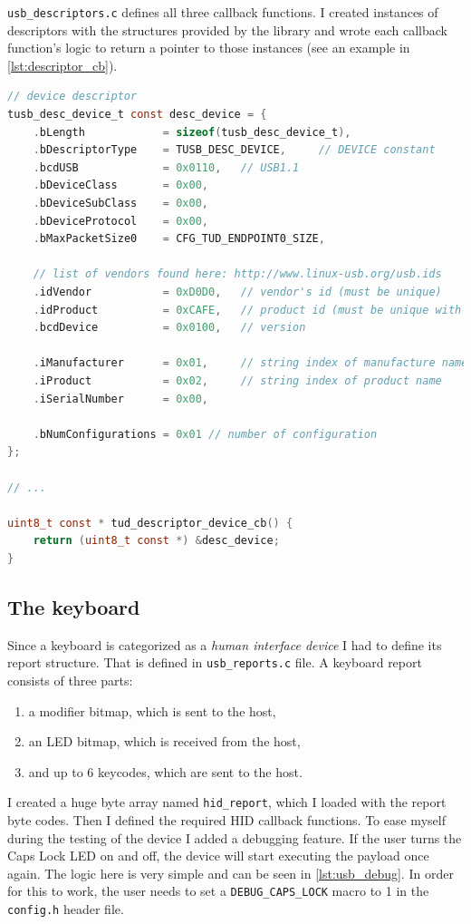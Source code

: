 \verb|usb_descriptors.c| defines all three callback functions. I created instances of descriptors with the structures provided by the library and wrote each callback function's logic to return a pointer to those instances (see an example in \autoref{lst:descriptor_cb}).

\begin{lstlisting}[caption={Definition of the \emph{device descriptor} and its callback function used in \texttt{usb\_descriptors.c}.},
                   label={lst:descriptor_cb},
                   language=c]
// device descriptor
tusb_desc_device_t const desc_device = {
    .bLength            = sizeof(tusb_desc_device_t),
    .bDescriptorType    = TUSB_DESC_DEVICE,     // DEVICE constant
    .bcdUSB             = 0x0110,   // USB1.1
    .bDeviceClass       = 0x00,
    .bDeviceSubClass    = 0x00,
    .bDeviceProtocol    = 0x00,
    .bMaxPacketSize0    = CFG_TUD_ENDPOINT0_SIZE,

    // list of vendors found here: http://www.linux-usb.org/usb.ids
    .idVendor           = 0xD0D0,   // vendor's id (must be unique)
    .idProduct          = 0xCAFE,   // product id (must be unique with vendor)
    .bcdDevice          = 0x0100,   // version

    .iManufacturer      = 0x01,     // string index of manufacture name
    .iProduct           = 0x02,     // string index of product name
    .iSerialNumber      = 0x00,

    .bNumConfigurations = 0x01 // number of configuration
};

// ...

uint8_t const * tud_descriptor_device_cb() {
    return (uint8_t const *) &desc_device;
}
\end{lstlisting}

\subsection{The keyboard}
Since a keyboard is categorized as a \emph{human interface device} I had to define its report structure. That is defined in \verb|usb_reports.c| file. A keyboard report consists of three parts:
\begin{enumerate}
    \item a modifier bitmap, which is sent to the host,
    \item an LED bitmap, which is received from the host,
    \item and up to 6 keycodes, which are sent to the host.
\end{enumerate}
I created a huge byte array named \verb|hid_report|, which I loaded with the report byte codes. Then I defined the required HID callback functions. To ease myself during the testing of the device I added a debugging feature. If the user turns the Caps Lock LED on and off, the device will start executing the payload once again. The logic here is very simple and can be seen in \autoref{lst:usb_debug}. In order for this to work, the user needs to set a \verb|DEBUG_CAPS_LOCK| macro to 1 in the \verb|config.h| header file.

